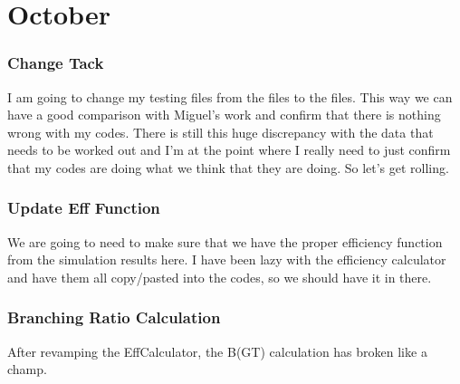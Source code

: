 \chapter{October}
\subsection{Change Tack}
I am going to change my testing files from the  files to the 
 files. This way we can have a good comparison with Miguel's work
and confirm that there is nothing wrong with my codes. There is still this 
huge discrepancy with the  data that needs to be worked out and
I'm at the point where I really need to just confirm that my codes are doing 
what we think that they are doing. So let's get rolling.

\subsection{Update Eff Function}
We are going to need to make sure that we have the proper efficiency function 
from the simulation results here. I have been lazy with the efficiency 
calculator and have them all copy/pasted into the codes, so we should have it 
in there.

\subsection{Branching Ratio Calculation}
After revamping the EffCalculator, the B(GT) calculation has broken like a 
champ.
